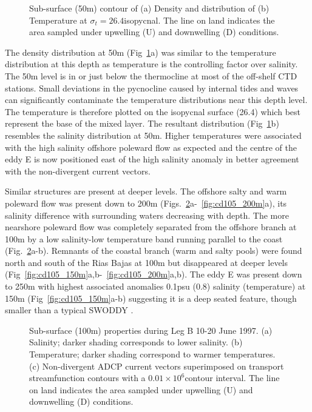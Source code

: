 \begin{figure}[ht]
\centering {}%
\caption{Sub-surface (50m) contour of (a) Density and distribution
of (b) Temperature at $\sigma_{t}=26.4$\dens isopycnal. The line
on land indicates the area sampled under upwelling (U) and
downwelling (D) conditions.} \label{fig:cd105_26.4}
\end{figure}
The density distribution at 50m (Fig~\ref{fig:cd105_26.4}a) was
similar to the temperature distribution at this depth as
temperature is the controlling factor over salinity. The 50m level
is in or just below the thermocline at most of the off-shelf CTD
stations. Small deviations in the pycnocline caused by internal
tides and waves can significantly contaminate the temperature
distributions near this depth level. The temperature is therefore
plotted on the isopycnal surface (26.4\dens) which best represent
the base of the mixed layer. The resultant distribution
(Fig~\ref{fig:cd105_26.4}b) resembles the salinity distribution at
50m. Higher temperatures were associated with the high salinity
offshore poleward flow as expected and the centre of the eddy E is
now positioned east of the high salinity anomaly in better
agreement with the non-divergent current vectors.


Similar structures are present at deeper levels. The offshore
salty and warm poleward flow was present down to 200m
(Figs.~\ref{fig:cd105_100m}a-~\ref{fig:cd105_200m}a), its salinity
difference with surrounding waters decreasing with depth. The more
nearshore poleward flow was completely separated from the offshore
branch at 100m by a low salinity-low temperature band running
parallel to the coast (Fig.~\ref{fig:cd105_100m}a-b). Remnants of
the coastal branch (warm and salty pools) were found north and
south of the Rias Bajas at 100m but disappeared at deeper levels
(Fig~\ref{fig:cd105_150m}a,b-~\ref{fig:cd105_200m}a,b). The eddy E
was present down to 250m with highest associated anomalies 0.1psu
(0.8\deg) salinity (temperature) at 150m
(Fig~\ref{fig:cd105_150m}a-b) suggesting it is a deep seated
feature, though smaller than a typical SWODDY \citep{Pingree92b}.



\begin{figure}[th]
\begin{widefig}{-.5cm}{-.7cm}
\centering {}%
 
\caption{Sub-surface (100m) properties during Leg B 10-20 June
1997. (a) Salinity; darker shading corresponds to lower salinity.
(b) Temperature; darker shading correspond to warmer temperatures.
(c) Non-divergent ADCP current vectors superimposed on transport
streamfunction contours with a $0.01\times 10^{6}$\tra contour
interval. The line on land indicates the area sampled under
upwelling (U) and downwelling (D) conditions.}
\label{fig:cd105_100m}\end{widefig}\end{figure}

